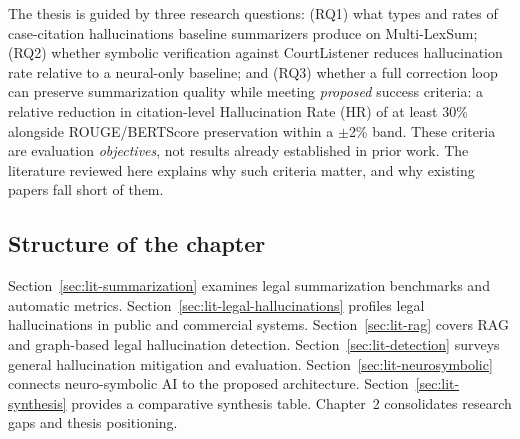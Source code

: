 The thesis is guided by three research questions: (RQ1) what types and rates of case-citation hallucinations baseline summarizers produce on Multi-LexSum; (RQ2) whether symbolic verification against CourtListener reduces hallucination rate relative to a neural-only baseline; and (RQ3) whether a full correction loop can preserve summarization quality while meeting \emph{proposed} success criteria: a relative reduction in citation-level Hallucination Rate (HR) of at least 30\% alongside ROUGE/BERTScore preservation within a $\pm$2\% band. These criteria are evaluation \emph{objectives}, not results already established in prior work. The literature reviewed here explains why such criteria matter, and why existing papers fall short of them.

\subsection{Structure of the chapter}

Section~\ref{sec:lit-summarization} examines legal summarization benchmarks and automatic metrics. Section~\ref{sec:lit-legal-hallucinations} profiles legal hallucinations in public and commercial systems. Section~\ref{sec:lit-rag} covers RAG and graph-based legal hallucination detection. Section~\ref{sec:lit-detection} surveys general hallucination mitigation and evaluation. Section~\ref{sec:lit-neurosymbolic} connects neuro-symbolic AI to the proposed architecture. Section~\ref{sec:lit-synthesis} provides a comparative synthesis table. Chapter~2 consolidates research gaps and thesis positioning.
